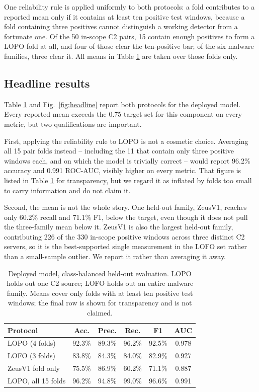 \documentclass[conference,a4paper]{IEEEtran}
\begin{document}
One reliability rule is applied uniformly to both protocols: a fold contributes to a reported mean only if it contains at least ten positive test windows, because a fold containing three positives cannot distinguish a working detector from a fortunate one. Of the 50 in-scope C2 pairs, 15 contain enough positives to form a LOPO fold at all, and four of those clear the ten-positive bar; of the six malware families, three clear it. All means in Table \ref{tab:headline} are taken over those folds only.

\subsection{Headline results}
Table \ref{tab:headline} and Fig.~\ref{fig:headline} report both protocols for the deployed model. Every reported mean exceeds the 0.75 target set for this component on every metric, but two qualifications are important.

First, applying the reliability rule to LOPO is not a cosmetic choice. Averaging all 15 pair folds instead -- including the 11 that contain only three positive windows each, and on which the model is trivially correct -- would report 96.2\% accuracy and 0.991 ROC-AUC, visibly higher on every metric. That figure is listed in Table \ref{tab:headline} for transparency, but we regard it as inflated by folds too small to carry information and do not claim it.

Second, the mean is not the whole story. One held-out family, ZeusV1, reaches only 60.2\% recall and 71.1\% F1, below the target, even though it does not pull the three-family mean below it. ZeusV1 is also the largest held-out family, contributing 226 of the 330 in-scope positive windows across three distinct C2 servers, so it is the best-supported single measurement in the LOFO set rather than a small-sample outlier. We report it rather than averaging it away.

\begin{table}[t]
\caption{Deployed model, class-balanced held-out evaluation. LOPO holds out one C2 source; LOFO holds out an entire malware family. Means cover only folds with at least ten positive test windows; the final row is shown for transparency and is not claimed.}
\label{tab:headline}
\centering
\footnotesize
\setlength{\tabcolsep}{3.4pt}
\begin{tabular}{lccccc}
\toprule
\textbf{Protocol} & \textbf{Acc.} & \textbf{Prec.} & \textbf{Rec.} & \textbf{F1} & \textbf{AUC} \\
\midrule
LOPO (4 folds) & 92.3\% & 89.3\% & 96.2\% & 92.5\% & 0.978 \\
LOFO (3 folds) & 83.8\% & 84.3\% & 84.0\% & 82.9\% & 0.927 \\
\midrule
\quad ZeusV1 fold only & 75.5\% & 86.9\% & 60.2\% & 71.1\% & 0.887 \\
\quad LOPO, all 15 folds & 96.2\% & 94.8\% & 99.0\% & 96.6\% & 0.991 \\
\bottomrule
\end{tabular}
\end{table}
\end{document}
